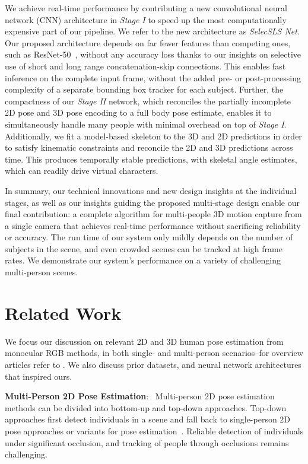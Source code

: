 \documentclass[acmtog,authorversion]{acmart}
\newcommand{\parahead}[1]{\textbf{#1}:\ }
\begin{document}
We achieve real-time performance by contributing a new convolutional neural network (CNN) architecture in \textit{Stage I} to speed up the most computationally expensive part of our pipeline. We refer to the new architecture as \textit{SelecSLS Net}. Our proposed architecture depends on far fewer features than competing ones, such as ResNet-50~\cite{he_resnet_cvpr2016}, without any accuracy loss thanks to our insights on selective use of short and long range concatenation-skip connections. This enables fast inference on the complete input frame, without the added pre- or post-processing complexity of a separate bounding box tracker for each subject.
Further, the compactness of our \textit{Stage II} network, which reconciles the partially incomplete 2D pose and 3D pose encoding to a full body pose estimate, enables it to simultaneously handle many people with minimal overhead on top of \textit{Stage I}.
Additionally, we fit a model-based skeleton to the 3D and 2D predictions in order to satisfy kinematic constraints and reconcile the 2D and 3D predictions across time. This produces temporally stable predictions, with skeletal angle estimates, which can readily 
drive virtual characters.

In summary, our technical innovations and new design insights at the individual stages, as well as our insights guiding the proposed multi-stage design enable our final contribution: a complete algorithm for multi-people 3D motion capture from a single camera that achieves real-time performance without sacrificing reliability or accuracy. The run time of our system only mildly depends on the number of subjects in the scene, and even crowded scenes can be tracked at high frame rates. We demonstrate our system's performance on a variety of challenging multi-person scenes.

 \section{Related Work}
\label{sec:rel-work}
We focus our discussion on relevant 2D and 3D human pose estimation from monocular RGB methods, in both single- and multi-person scenarios--for overview articles refer to \citet{sarafianos_posesurvey_cviu2016,DBLP:journals/jcst/XiaGLYC17}.
We also discuss prior datasets, and neural network architectures that inspired ours.

\parahead{Multi-Person 2D Pose Estimation}
Multi-person 2D pose estimation methods can be divided into bottom-up and top-down approaches. Top-down approaches first detect individuals in a scene and fall back to single-person 2D pose approaches or variants for pose estimation~\cite{pishchulin_reshape_cvpr12,gkioxari2014using,sun2011articulated,iqbal2016multi,papandreou2017towards}. Reliable detection of individuals under significant occlusion, and tracking of people through occlusions remains challenging.
\end{document}
